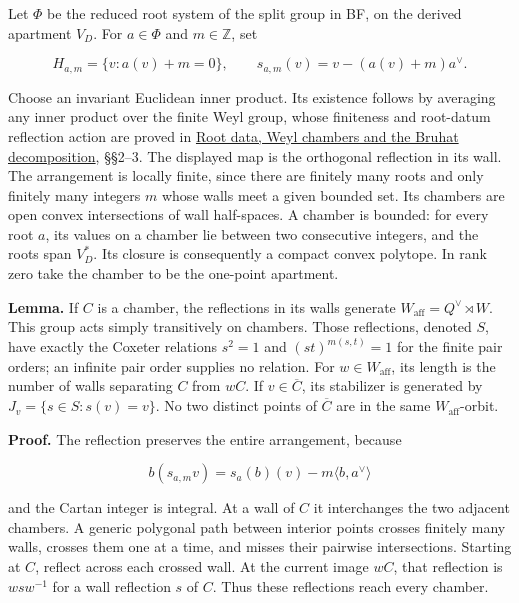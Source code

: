 \documentclass[
  11pt,
]{article}
\begin{document}
Let \(\Phi\) be the reduced root system of the split group in BF, on the
derived apartment \(V_D\). For \(a\in\Phi\) and \(m\in\mathbb Z\), set

\[
 H_{a,m}=\{v:a(v)+m=0\},\qquad
 s_{a,m}(v)=v-(a(v)+m)a^\vee.
 \tag{AB.5}
\]

Choose an invariant Euclidean inner product. Its existence follows by
averaging any inner product over the finite Weyl group, whose finiteness
and root-datum reflection action are proved in
\href{../AG-RG/AG-RG-04.html}{Root data, Weyl chambers and the Bruhat
decomposition}, §§2--3. The displayed map is the orthogonal reflection
in its wall. The arrangement is locally finite, since there are finitely
many roots and only finitely many integers \(m\) whose walls meet a
given bounded set. Its chambers are open convex intersections of wall
half-spaces. A chamber is bounded: for every root \(a\), its values on a
chamber lie between two consecutive integers, and the roots span
\(V_D^*\). Its closure is consequently a compact convex polytope. In
rank zero take the chamber to be the one-point apartment.

\textbf{Lemma.} If \(C\) is a chamber, the reflections in its walls
generate \(W_{\mathrm{aff}}=Q^\vee\rtimes W\). This group acts simply
transitively on chambers. Those reflections, denoted \(S\), have exactly
the Coxeter relations \(s^2=1\) and \((st)^{m(s,t)}=1\) for the finite
pair orders; an infinite pair order supplies no relation. For
\(w\in W_{\mathrm{aff}}\), its length is the number of walls separating
\(C\) from \(wC\). If \(v\in\overline C\), its stabilizer is generated
by \(J_v=\{s\in S:s(v)=v\}\). No two distinct points of \(\overline C\)
are in the same \(W_{\mathrm{aff}}\)-orbit.

\textbf{Proof.} The reflection preserves the entire arrangement, because

\[
 b(s_{a,m}v)=s_a(b)(v)-m\langle b,a^\vee\rangle
\]

and the Cartan integer is integral. At a wall of \(C\) it interchanges
the two adjacent chambers. A generic polygonal path between interior
points crosses finitely many walls, crosses them one at a time, and
misses their pairwise intersections. Starting at \(C\), reflect across
each crossed wall. At the current image \(wC\), that reflection is
\(wsw^{-1}\) for a wall reflection \(s\) of \(C\). Thus these
reflections reach every chamber.
\end{document}
